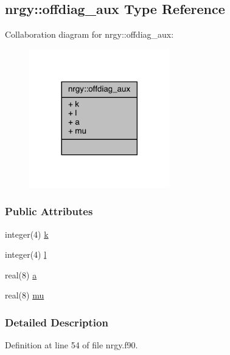 \hypertarget{structnrgy_1_1offdiag__aux}{\subsection{nrgy\-:\-:offdiag\-\_\-aux Type Reference}
\label{structnrgy_1_1offdiag__aux}
}


Collaboration diagram for nrgy\-:\-:offdiag\-\_\-aux\-:
\nopagebreak
\begin{figure}[H]
\begin{center}
\leavevmode
\includegraphics[width=173pt]{structnrgy_1_1offdiag__aux__coll__graph}
\end{center}
\end{figure}
\subsubsection*{Public Attributes}
\begin{DoxyCompactItemize}
\item 
integer(4) \hyperlink{structnrgy_1_1offdiag__aux_a8d348e8df33899d1cd598b0e9dd7748a}{k}
\item 
integer(4) \hyperlink{structnrgy_1_1offdiag__aux_a81e07f9b21718a57326a8c41ee996f08}{l}
\item 
real(8) \hyperlink{structnrgy_1_1offdiag__aux_a1187f9c7d2863dc0d8ad0008cc9558e3}{a}
\item 
real(8) \hyperlink{structnrgy_1_1offdiag__aux_aa5a8d9ed254f33814659b5133c3f90c6}{mu}
\end{DoxyCompactItemize}


\subsubsection{Detailed Description}


Definition at line 54 of file nrgy.\-f90.



